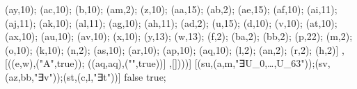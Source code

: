 (ay,10); (ac,10); (b,10); (am,2); (z,10); (aa,15); (ab,2); (ae,15); (af,10); (ai,11); (aj,11); (ak,10); (al,11); (ag,10); (ah,11); (ad,2); (u,15); (d,10); (v,10); (at,10); (ax,10); (au,10); (av,10); (x,10); (y,13); (w,13); (f,2); (ba,2); (bb,2); (p,22); (m,2); (o,10); (k,10); (n,2); (as,10); (ar,10); (ap,10); (aq,10); (l,2); (an,2); (r,2); (h,2)] ,[((e,w),("\state A",true)); ((aq,aq),("",true))] ,[])))] [(su,(a,m,"∃U_0,\ldots,U_{63}"));(sv,(az,bb,"∃v"));(st,(c,l,"∃t"))] false true;

